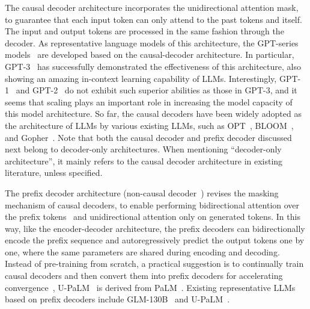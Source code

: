 { 
The causal decoder architecture incorporates the unidirectional attention mask, to guarantee that each input token can only attend to the past tokens and itself. 
The input and output tokens are processed in the same fashion through the decoder. As representative language models of this architecture, the GPT-series models~\cite{radford-openai-2018-improving,radford-blog-2019-language,Brown-NeurIPS-2020-Language} are developed based on the causal-decoder architecture. 
In particular, GPT-3~\cite{Brown-NeurIPS-2020-Language} has successfully demonstrated the effectiveness of this architecture, also showing an amazing in-context learning capability of LLMs.
Interestingly, GPT-1~\cite{radford-openai-2018-improving} and GPT-2~\cite{radford-blog-2019-language} do not exhibit such superior abilities as those in GPT-3, and it seems that scaling plays an important role in increasing the model capacity of this model architecture. 
So far, 
the causal decoders have been widely adopted as the architecture of LLMs by various existing LLMs, such as OPT~\cite{Zhang-arxiv-2022-OPT}, BLOOM~\cite{Scao-arxiv-2022-BLOOM}, and Gopher~\cite{Rae-arxiv-2021-Scaling}. 
{
Note that both the causal decoder and prefix decoder discussed next belong to decoder-only architectures. When  mentioning  ``{decoder-only architecture}'', it mainly refers to the causal decoder architecture in existing literature, unless specified. }

The prefix decoder architecture {(\aka non-causal decoder~\cite{Zhang-ICML-2022-Examining})}  revises the masking mechanism of causal decoders, to enable performing bidirectional attention over the prefix tokens~\cite{Dong-NIPS-2019-Unified} and unidirectional attention only on generated tokens. 
In this way, like the encoder-decoder architecture, the prefix decoders can bidirectionally encode the prefix sequence and autoregressively predict the output tokens one by one, where the same parameters are shared during encoding and decoding. 
Instead of pre-training from scratch, a practical suggestion is to continually train causal decoders and then convert them into prefix decoders for accelerating convergence~\cite{Wang-ICML-2022-What}, \eg U-PaLM~\cite{Tay-arxiv-2022-Transcending} is derived from PaLM~\cite{Chowdhery-arxiv-2022-PaLM}. Existing representative LLMs based on prefix decoders include GLM-130B~\cite{Zeng-arxiv-2022-GLM} and U-PaLM~\cite{Tay-arxiv-2022-Transcending}.

}
